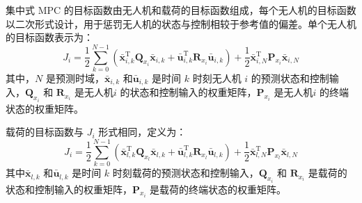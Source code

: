 \documentclass[lang=chs, degree=master, blindreview=true, winfonts=true]{yanputhesis}
\begin{document}
集中式 MPC 的目标函数由无人机和载荷的目标函数组成，每个无人机的目标函数以二次形式设计，用于惩罚无人机的状态与控制相较于参考值的偏差。单个无人机的目标函数表示为：
\begin{equation}
	J_i = \frac{1}{2}\sum_{k=0}^{N-1}\left(\bar{\boldsymbol{x}}_{i,k}^\mathrm{T}\boldsymbol{Q}_{x_i}\bar{\boldsymbol{x}}_{i,k}+\bar{\boldsymbol{u}}_{i,k}^\mathrm{T}\boldsymbol{R}_{x_i}\bar{\boldsymbol{u}}_{i,k}\right)+\frac{1}{2}\bar{\boldsymbol{x}}_{i,N}^\mathrm{T}\boldsymbol{P}_{x_i}\bar{\boldsymbol{x}}_{i,N}
	\label{juav}
\end{equation}
其中，$N$ 是预测时域，$\bar{\boldsymbol{x}}_{i,k}$ 和$\bar{\boldsymbol{u}}_{i,k}$ 是时间 $k$ 时刻无人机 $i$ 的预测状态和控制输入，$\boldsymbol{Q}_{x_i}$ 和 $\boldsymbol{R}_{x_i}$ 是无人机$i$ 的状态和控制输入的权重矩阵，$\boldsymbol{P}_{x_i}$ 是无人机$i$ 的终端状态的权重矩阵。

载荷的目标函数与 \( J_i \) 形式相同，定义为：
\begin{equation}
    J_i = \frac{1}{2}\sum_{k=0}^{N-1}\left(\bar{\boldsymbol{x}}_{l,k}^\mathrm{T}\boldsymbol{Q}_{x_l}\bar{\boldsymbol{x}}_{l,k}+\bar{\boldsymbol{u}}_{l,k}^\mathrm{T}\boldsymbol{R}_{x_l}\bar{\boldsymbol{u}}_{l,k}\right)+\frac{1}{2}\bar{\boldsymbol{x}}_{l,N}^\mathrm{T}\boldsymbol{P}_{x_l}\bar{\boldsymbol{x}}_{l,N}
	\label{jpayload}
\end{equation}
其中$\bar{\boldsymbol{x}}_{l,k}$ 和$\bar{\boldsymbol{u}}_{l,k}$ 是时间 $k$ 时刻载荷的预测状态和控制输入，$\boldsymbol{Q}_{x_i}$ 和 $\boldsymbol{R}_{x_i}$ 是载荷的状态和控制输入的权重矩阵，$\boldsymbol{P}_{x_i}$ 是载荷的终端状态的权重矩阵。
\end{document}
